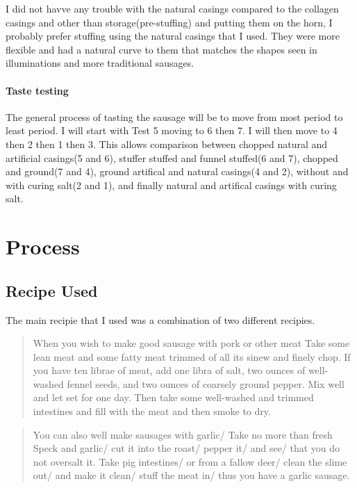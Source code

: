 \documentclass[letterpaper,11pt,leqno]{article}
\begin{document}
I did not havve any trouble with the natural casings compared to the collagen casings and other than storage(pre-stuffing) and putting them on the horn, I probably prefer stuffing using the natural casings that I used. They were more flexible and had a natural curve to them that matches the shapes seen in illuminations and more traditional sausages.

\paragraph{Taste testing} The general process of tasting the sausage will be to move from most period to least period. I will start with Test 5 moving to 6 then 7. I will then move to 4 then 2 then 1 then 3. This allows comparison between chopped natural and artificial casings(5 and 6), stuffer stuffed and funnel stuffed(6 and 7), chopped and ground(7 and 4), ground artifical and natural casings(4 and 2), without and with curing salt(2 and 1), and finally natural and artifical casings with curing salt.



\appendix

\section{Process}\label{a:appendix1}

\subsection{Recipe Used}

The main recipie that I used was a combination of two different recipies. 

\begin{quote}
	When you wish to make good sausage with pork or other meat
	Take some lean meat and some fatty meat trimmed of all its sinew and finely chop.  If you have ten librae of meat, add one libra of salt, two ounces of well-washed fennel seeds, and two ounces of coarsely ground pepper.  Mix well and let set for one day.  Then take some well-washed and trimmed intestines and fill with the meat and then smoke to dry. \citep{martino2005art}
\end{quote}

\begin{quote}
	You can also well make sausages with garlic/ Take no more than fresh Speck and garlic/ cut it into the roast/ pepper it/ and see/ that you do not oversalt it.  Take pig intestines/ or from a fallow deer/ clean the slime out/ and make it clean/ stuff the meat in/ thus you have a garlic sausage. \citep{rumpolt1980new}
\end{quote}
\end{document}
